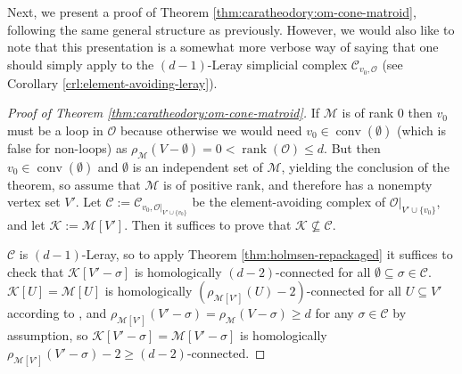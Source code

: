 \documentclass[a4paper,11pt,reqno, english]{amsart}
\theoremstyle{definition}
\theoremstyle{remark}
\DeclareMathOperator{\conv}{\mathrm{conv}}
\begin{document}
Next, we present a proof of Theorem \ref{thm:caratheodory:om-cone-matroid}, following the same general structure as previously. However, we would also like to note that this presentation is a somewhat more verbose way of saying that one should simply apply \cite[Theorem 1.6]{KalaiMeshulam2005} to the $(d-1)$-Leray simplicial complex $\mathscr{C}_{v_0,\mathscr{O}}$ (see Corollary \ref{crl:element-avoiding-leray}).
\begin{proof}[Proof of Theorem \ref{thm:caratheodory:om-cone-matroid}]
    If $\mathscr{M}$ is of rank $0$ then $v_0$ must be a loop in $\mathscr{O}$ because otherwise we would need $v_0\in\conv(\emptyset)$ (which is false for non-loops) as $\rho_\mathscr{M}(V-\emptyset)=0<\operatorname{rank}(\mathscr{O})\leq d$. But then $v_0\in\conv(\emptyset)$ and $\emptyset$ is an independent set of $\mathscr{M}$, yielding the conclusion of the theorem, so assume that $\mathscr{M}$ is of positive rank, and therefore has a nonempty vertex set $V'$.
    Let $\mathscr{C}:=\mathscr{C}_{v_0,\mathscr{O}|_{V'\cup\{v_0\}}}$ be the element-avoiding complex of $\mathscr{O}|_{V'\cup\{v_0\}}$, and let $\mathscr{K}:=\mathscr{M}[V']$. Then it suffices to prove that $\mathscr{K}\nsubseteq\mathscr{C}$.

    $\mathscr{C}$ is $(d-1)$-Leray, so to apply Theorem \ref{thm:holmsen-repackaged} it suffices to check that $\mathscr{K}[V'-\sigma]$ is homologically $(d-2)$-connected for all $\emptyset\subseteq\sigma\in\mathscr{C}$. $\mathscr{K}[U]=\mathscr{M}[U]$ is homologically $(\rho_{\mathscr{M}[V']}(U)-2)$-connected for all $U\subseteq V'$ according to \cite[Lemma 3.2]{Holmsen2016}, and $\rho_{\mathscr{M}[V']}(V'-\sigma)=\rho_\mathscr{M}(V-\sigma)\geq d$ for any $\sigma\in\mathscr{C}$ by assumption, so $\mathscr{K}[V'-\sigma]=\mathscr{M}[V'-\sigma]$ is homologically $\rho_{\mathscr{M}[V']}(V'-\sigma)-2\geq (d-2)$-connected.
\end{proof}
\end{document}
